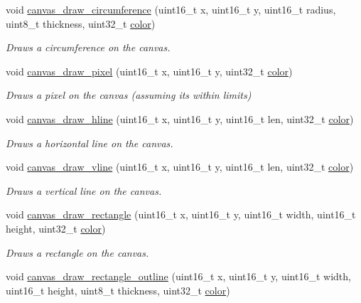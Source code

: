 \begin{DoxyCompactItemize}
void \mbox{\hyperlink{group__canvas_ga48f0ded465dd3ec65ac6b748f61f1802}{canvas\+\_\+draw\+\_\+circumference}} (uint16\+\_\+t x, uint16\+\_\+t y, uint16\+\_\+t radius, uint8\+\_\+t thickness, uint32\+\_\+t \mbox{\hyperlink{structcolor}{color}})
\begin{DoxyCompactList}\small\item\em Draws a circumference on the canvas. \end{DoxyCompactList}\item 
void \mbox{\hyperlink{group__canvas_ga5c7fe2ae7aef254a950523cd180b9d79}{canvas\+\_\+draw\+\_\+pixel}} (uint16\+\_\+t x, uint16\+\_\+t y, uint32\+\_\+t \mbox{\hyperlink{structcolor}{color}})
\begin{DoxyCompactList}\small\item\em Draws a pixel on the canvas (assuming it\textquotesingle{}s within limits) \end{DoxyCompactList}\item 
void \mbox{\hyperlink{group__canvas_ga6e24c5fefa7848e9a29d146af77356f7}{canvas\+\_\+draw\+\_\+hline}} (uint16\+\_\+t x, uint16\+\_\+t y, uint16\+\_\+t len, uint32\+\_\+t \mbox{\hyperlink{structcolor}{color}})
\begin{DoxyCompactList}\small\item\em Draws a horizontal line on the canvas. \end{DoxyCompactList}\item 
void \mbox{\hyperlink{group__canvas_gae2adf4c3c6c687a5b8885b6a2fa45b3a}{canvas\+\_\+draw\+\_\+vline}} (uint16\+\_\+t x, uint16\+\_\+t y, uint16\+\_\+t len, uint32\+\_\+t \mbox{\hyperlink{structcolor}{color}})
\begin{DoxyCompactList}\small\item\em Draws a vertical line on the canvas. \end{DoxyCompactList}\item 
void \mbox{\hyperlink{group__canvas_ga4d89ce4c1a9450f7a5ee8e1281832584}{canvas\+\_\+draw\+\_\+rectangle}} (uint16\+\_\+t x, uint16\+\_\+t y, uint16\+\_\+t width, uint16\+\_\+t height, uint32\+\_\+t \mbox{\hyperlink{structcolor}{color}})
\begin{DoxyCompactList}\small\item\em Draws a rectangle on the canvas. \end{DoxyCompactList}\item 
void \mbox{\hyperlink{group__canvas_ga5301d24065ffd6d68ead836aaeb197f3}{canvas\+\_\+draw\+\_\+rectangle\+\_\+outline}} (uint16\+\_\+t x, uint16\+\_\+t y, uint16\+\_\+t width, uint16\+\_\+t height, uint8\+\_\+t thickness, uint32\+\_\+t \mbox{\hyperlink{structcolor}{color}})

\end{DoxyCompactItemize}
